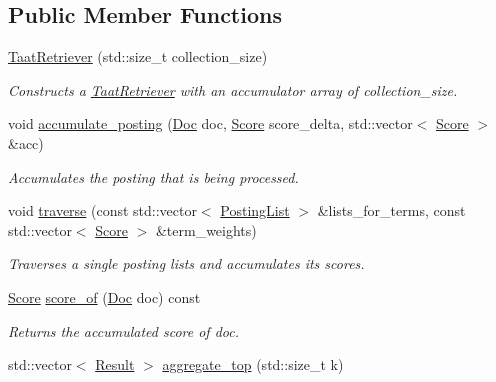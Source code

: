 \subsection*{Public Member Functions}
\begin{DoxyCompactItemize}
\item 
\hyperlink{classbloodhound_1_1query_1_1TaatRetriever_af443da08f4200fb84a3481d47bc4ac35}{Taat\+Retriever} (std\+::size\+\_\+t collection\+\_\+size)
\begin{DoxyCompactList}\small\item\em Constructs a \hyperlink{classbloodhound_1_1query_1_1TaatRetriever}{Taat\+Retriever} with an accumulator array of collection\+\_\+size. \end{DoxyCompactList}\item 
void \hyperlink{classbloodhound_1_1query_1_1TaatRetriever_a34def8d627b446d7459792ab9c50dcab}{accumulate\+\_\+posting} (\hyperlink{structbloodhound_1_1Doc}{Doc} doc, \hyperlink{structbloodhound_1_1Score}{Score} score\+\_\+delta, std\+::vector$<$ \hyperlink{structbloodhound_1_1Score}{Score} $>$ \&acc)
\begin{DoxyCompactList}\small\item\em Accumulates the posting that is being processed. \end{DoxyCompactList}\item 
void \hyperlink{classbloodhound_1_1query_1_1TaatRetriever_a1b476e4ada85862cb79a92b6424d2aa2}{traverse} (const std\+::vector$<$ \hyperlink{classbloodhound_1_1PostingList}{Posting\+List} $>$ \&lists\+\_\+for\+\_\+terms, const std\+::vector$<$ \hyperlink{structbloodhound_1_1Score}{Score} $>$ \&term\+\_\+weights)
\begin{DoxyCompactList}\small\item\em Traverses a single posting lists and accumulates its scores. \end{DoxyCompactList}\item 
\hyperlink{structbloodhound_1_1Score}{Score} \hyperlink{classbloodhound_1_1query_1_1TaatRetriever_ae1c8d9643ca85ba7dba32325538e30b5}{score\+\_\+of} (\hyperlink{structbloodhound_1_1Doc}{Doc} doc) const
\begin{DoxyCompactList}\small\item\em Returns the accumulated score of doc. \end{DoxyCompactList}\item 
std\+::vector$<$ \hyperlink{structbloodhound_1_1query_1_1Result}{Result} $>$ \hyperlink{classbloodhound_1_1query_1_1TaatRetriever_a7f631f87075249c768873d15a59956c5}{aggregate\+\_\+top} (std\+::size\+\_\+t k)

\end{DoxyCompactItemize}
